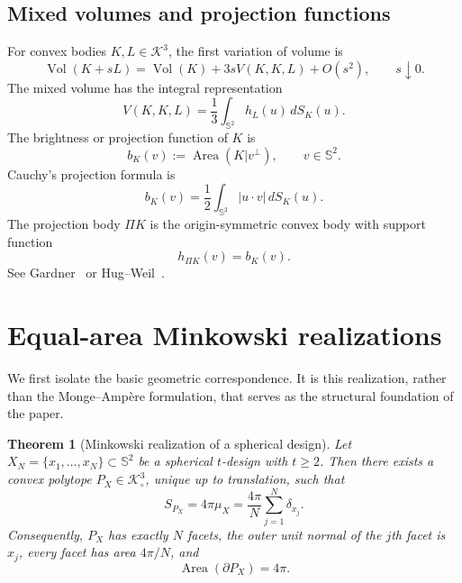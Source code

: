 \documentclass[11pt]{article}
\newtheorem{theorem}{Theorem}[section]
\theoremstyle{definition}
\theoremstyle{remark}
\newcommand{\Sph}{\mathbb S}
\newcommand{\K}{\mathcal K}
\newcommand{\Area}{\operatorname{Area}}
\newcommand{\Vol}{\operatorname{Vol}}
\begin{document}
\subsection{Mixed volumes and projection functions}
For convex bodies $K,L\in\K^3$, the first variation of volume is
\[
\Vol(K+sL)=\Vol(K)+3sV(K,K,L)+O(s^2),\qquad s\downarrow0.
\]
The mixed volume has the integral representation
\begin{equation}\label{eq:mixed-volume}
V(K,K,L)=\frac13\int_{\Sph^2}h_L(u)\,dS_K(u).
\end{equation}
The brightness or projection function of $K$ is
\[
b_K(v):=\Area(K|v^\perp),\qquad v\in\Sph^2.
\]
Cauchy's projection formula is
\begin{equation}\label{eq:cauchy}
b_K(v)=\frac12\int_{\Sph^2}|u\cdot v|\,dS_K(u).
\end{equation}
The projection body $\Pi K$ is the origin-symmetric convex body with support function
\begin{equation}\label{eq:projection-body}
h_{\Pi K}(v)=b_K(v).
\end{equation}
See Gardner~\cite{Gardner2006} or Hug--Weil~\cite{HugWeil2020}.

\section{Equal-area Minkowski realizations}\label{sec:realization}

We first isolate the basic geometric correspondence. It is this realization, rather than the Monge--Amp\`ere formulation, that serves as the structural foundation of the paper.

\begin{theorem}[Minkowski realization of a spherical design]\label{thm:realization}
Let $X_N=\{x_1,\dots,x_N\}\subset\Sph^2$ be a spherical $t$-design with $t\ge2$. Then there exists a convex polytope $P_X\in\K^3_\circ$, unique up to translation, such that
\begin{equation}\label{eq:realization}
S_{P_X}=4\pi\mu_X=\frac{4\pi}{N}\sum_{j=1}^N\delta_{x_j}.
\end{equation}
Consequently, $P_X$ has exactly $N$ facets, the outer unit normal of the $j$th facet is $x_j$, every facet has area $4\pi/N$, and
\begin{equation}\label{eq:surface-total}
\Area(\partial P_X)=4\pi.
\end{equation}
\end{theorem}
\end{document}
